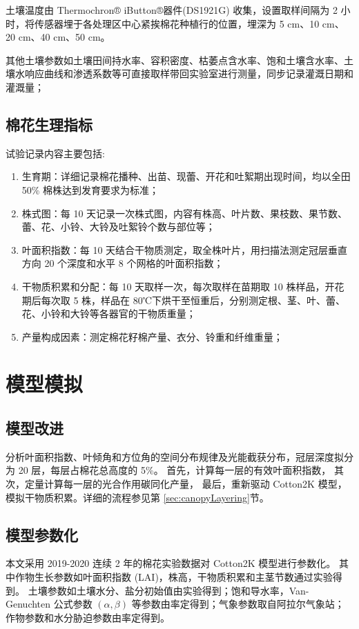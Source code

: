 土壤温度由 Thermochron® iButton®器件(DS1921G) 收集，设置取样间隔为 2 小时，将传感器埋于各处理区中心紧挨棉花种植行的位置，埋深为 5 cm、10 cm、20 cm、40 cm、50 cm。

其他土壤参数如土壤田间持水率、容积密度、枯萎点含水率、饱和土壤含水率、土壤水响应曲线和渗透系数等可直接取样带回实验室进行测量，同步记录灌溉日期和灌溉量；
\subsection{棉花生理指标}
试验记录内容主要包括:
\begin{enumerate}
    \item 生育期：详细记录棉花播种、出苗、现蕾、开花和吐絮期出现时间，均以全田 50\% 棉株达到发育要求为标准；
    \item 株式图：每 10 天记录一次株式图，内容有株高、叶片数、果枝数、果节数、蕾、花、小铃、大铃及吐絮铃个数与部位等；
    \item 叶面积指数：每 10 天结合干物质测定，取全株叶片，用扫描法测定冠层垂直方向 20 个深度和水平 8 个网格的叶面积指数；
    \item 干物质积累和分配：每 10 天取样一次，每次取样在苗期取 10 株样品，开花期后每次取 5 株，样品在 80℃下烘干至恒重后，分别测定根、茎、叶、蕾、花、小铃和大铃等各器官的干物质重量；
    \item 产量构成因素：测定棉花籽棉产量、衣分、铃重和纤维重量；
\end{enumerate}

\section{模型模拟}
\subsection{模型改进}

分析叶面积指数、叶倾角和方位角的空间分布规律及光能截获分布，冠层深度拟分为 20 层，每层占棉花总高度的 5\%。
首先，计算每一层的有效叶面积指数，%
其次，定量计算每一层的光合作用碳同化产量，%
最后，重新驱动 Cotton2K 模型，模拟干物质积累。详细的流程参见第 \ref{sec:canopyLayering}节。

\subsection{模型参数化}
本文采用 2019-2020 连续 2 年的棉花实验数据对 Cotton2K 模型进行参数化。
其中作物生长参数如叶面积指数 (LAI)，株高，干物质积累和主茎节数通过实验得到。
土壤参数如土壤水分、盐分初始值由实验得到；饱和导水率，Van-Genuchten
公式参数 $(\alpha, \beta)$ 等参数由率定得到；气象参数取自阿拉尔气象站；
作物参数和水分胁迫参数由率定得到。

